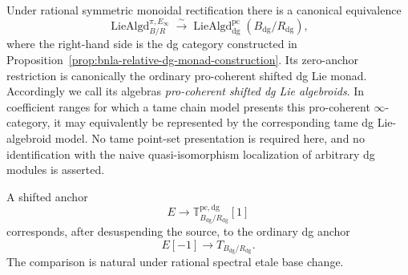 \begin{theorem}
\label{thm:bnla-rational-monad-rectification}
Under rational symmetric monoidal rectification there is a canonical
equivalence
\[
\boxed{
    \operatorname{LieAlgd}^{\pi,E_\infty}_{B/R}
    \xrightarrow{\sim}
    \operatorname{LieAlgd}^{\mathrm{pc}}_{\mathrm{dg}}
    (B_{\mathrm{dg}}/R_{\mathrm{dg}}),}
\]
where the right-hand side is the dg category constructed in
Proposition~\ref{prop:bnla-relative-dg-monad-construction}.  Its zero-anchor
restriction is canonically the ordinary pro-coherent shifted dg Lie monad.
Accordingly we call its algebras \emph{pro-coherent shifted dg Lie
algebroids}.  In coefficient ranges for which a tame chain model presents
this pro-coherent $\infty$-category, it may equivalently be represented by the
corresponding tame dg Lie-algebroid model.  No tame point-set presentation is
required here, and no identification with the naive quasi-isomorphism
localization of arbitrary dg modules is asserted.

A shifted anchor
\[
    E\longrightarrow
    \mathbb T^{\mathrm{pc,dg}}_{B_{\mathrm{dg}}/R_{\mathrm{dg}}}[1]
\]
corresponds, after desuspending the source, to the ordinary dg anchor
\[
\boxed{
    E[-1]
    \longrightarrow
    T_{B_{\mathrm{dg}}/R_{\mathrm{dg}}}.}
\]
The comparison is natural under rational spectral etale base change.
\end{theorem}

